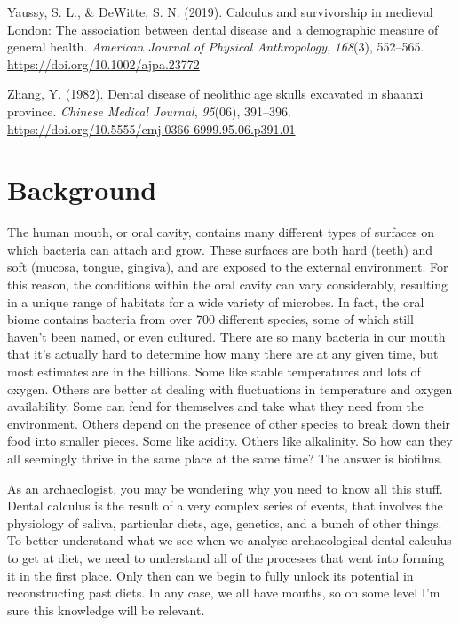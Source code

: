 \documentclass[
  letterpaper,
]{book}
\newlength{\cslhangindent}
\newlength{\cslentryspacingunit} %
\newenvironment{CSLReferences}[2] %
 {%
  \setlength{\parindent}{0pt}
  \ifodd #1
  \let\oldpar\par
  \def\par{\hangindent=\cslhangindent\oldpar}
  \fi
  \setlength{\parskip}{#2\cslentryspacingunit}
 }%
 {}
\begin{document}
\begin{CSLReferences}{1}{0}
\leavevmode{}%
Yaussy, S. L., \& DeWitte, S. N. (2019). Calculus and survivorship in
medieval {London}: {The} association between dental disease and a
demographic measure of general health. \emph{American Journal of
Physical Anthropology}, \emph{168}(3), 552--565.
\url{https://doi.org/10.1002/ajpa.23772}

\leavevmode{}%
Zhang, Y. (1982). Dental disease of neolithic age skulls excavated in
shaanxi province. \emph{Chinese Medical Journal}, \emph{95}(06),
391--396. \url{https://doi.org/10.5555/cmj.0366-6999.95.06.p391.01}

\end{CSLReferences}


\hypertarget{chap-background}{%
\chapter{Background}\label{chap-background}}

The human mouth, or oral cavity, contains many different types of
surfaces on which bacteria can attach and grow. These surfaces are both
hard (teeth) and soft (mucosa, tongue, gingiva), and are exposed to the
external environment. For this reason, the conditions within the oral
cavity can vary considerably, resulting in a unique range of habitats
for a wide variety of microbes. In fact, the oral biome contains
bacteria from over 700 different species, some of which still haven't
been named, or even cultured. There are so many bacteria in our mouth
that it's actually hard to determine how many there are at any given
time, but most estimates are in the billions. Some like stable
temperatures and lots of oxygen. Others are better at dealing with
fluctuations in temperature and oxygen availability. Some can fend for
themselves and take what they need from the environment. Others depend
on the presence of other species to break down their food into smaller
pieces. Some like acidity. Others like alkalinity. So how can they all
seemingly thrive in the same place at the same time? The answer is
biofilms.

As an archaeologist, you may be wondering why you need to know all this
stuff. Dental calculus is the result of a very complex series of events,
that involves the physiology of saliva, particular diets, age, genetics,
and a bunch of other things. To better understand what we see when we
analyse archaeological dental calculus to get at diet, we need to
understand all of the processes that went into forming it in the first
place. Only then can we begin to fully unlock its potential in
reconstructing past diets. In any case, we all have mouths, so on some
level I'm sure this knowledge will be relevant.
\end{document}
